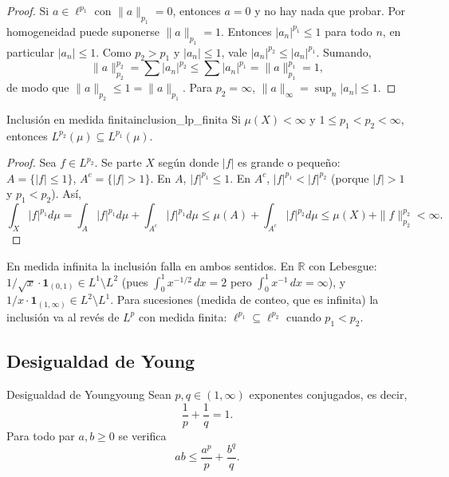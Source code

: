 \documentclass[11pt, a4paper]{article}
\begin{document}
\begin{proof}
Si $a \in \ell^{p_1}$ con $\|a\|_{p_1} = 0$, entonces $a = 0$ y no hay nada que probar. Por
homogeneidad puede suponerse $\|a\|_{p_1} = 1$. Entonces $|a_n|^{p_1} \le 1$ para todo $n$, en
particular $|a_n| \le 1$. Como $p_2 > p_1$ y $|a_n| \le 1$, vale $|a_n|^{p_2} \le |a_n|^{p_1}$.
Sumando,
$$ \|a\|_{p_2}^{p_2} = \sum |a_n|^{p_2} \le \sum |a_n|^{p_1} = \|a\|_{p_1}^{p_1} = 1, $$
de modo que $\|a\|_{p_2} \le 1 = \|a\|_{p_1}$. Para $p_2 = \infty$,
$\|a\|_\infty = \sup_n |a_n| \le 1$.
\end{proof}

\begin{proposicion}{Inclusión en medida finita}{inclusion_lp_finita}
Si $\mu(X) < \infty$ y $1 \le p_1 < p_2 < \infty$, entonces $L^{p_2}(\mu) \subseteq L^{p_1}(\mu)$.
\end{proposicion}

\begin{proof}
Sea $f \in L^{p_2}$. Se parte $X$ según donde $|f|$ es grande o pequeño: $A = \{|f| \le 1\}$,
$A^c = \{|f| > 1\}$. En $A$, $|f|^{p_1} \le 1$. En $A^c$, $|f|^{p_1} < |f|^{p_2}$ (porque $|f| > 1$
y $p_1 < p_2$). Así,
$$ \int_X |f|^{p_1} d\mu = \int_A |f|^{p_1} d\mu + \int_{A^c} |f|^{p_1} d\mu \le \mu(A) + \int_{A^c}
|f|^{p_2} d\mu \le \mu(X) + \|f\|_{p_2}^{p_2} < \infty. $$
\end{proof}

\obs En medida infinita la inclusión falla en ambos sentidos. En $\mathbb{R}$ con Lebesgue:
$1/\sqrt{x} \cdot \mathbf{1}_{(0,1)} \in L^1 \setminus L^2$ (pues $\int_0^1 x^{-1/2}\,dx = 2$ pero $\int_0^1 x^{-1}\,dx = \infty$), y
$1/x \cdot \mathbf{1}_{(1,\infty)} \in L^2 \setminus L^1$. Para sucesiones (medida de conteo, que es
infinita) la inclusión va al revés de $L^p$ con medida finita: $\ell^{p_1} \subseteq \ell^{p_2}$
cuando $p_1 < p_2$.

\subsection{Desigualdad de Young}

\begin{teorema}{Desigualdad de Young}{young}
Sean $p, q \in (1, \infty)$ exponentes conjugados, es decir,
$$ \frac{1}{p} + \frac{1}{q} = 1. $$
Para todo par $a, b \ge 0$ se verifica
$$ ab \le \frac{a^p}{p} + \frac{b^q}{q}. $$
\end{teorema}
\end{document}
